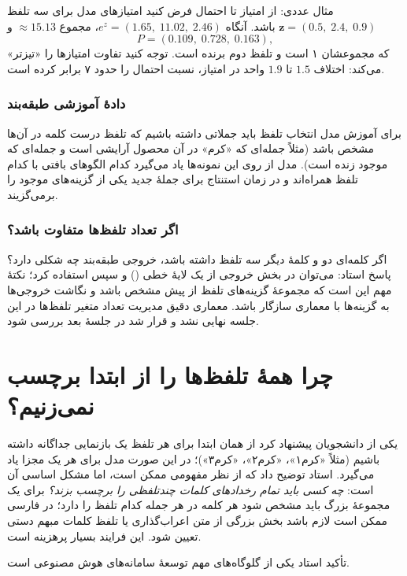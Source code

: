 \begin{addedbox}{مثال عددی: از امتیاز تا احتمال}
فرض کنید امتیازهای مدل برای سه تلفظ $\mathbf{z}=(0.5,\;2.4,\;0.9)$ باشد. آنگاه $e^{z}=(1.65,\;11.02,\;2.46)$، مجموع $\approx15.13$ و
\[
P=(0.109,\;0.728,\;0.163),
\]
که مجموعشان ۱ است و تلفظ دوم برنده است. توجه کنید  تفاوت امتیازها را «تیزتر» می‌کند: اختلاف $1.5$ تا $1.9$ واحد در امتیاز، نسبت احتمال را حدود ۷ برابر کرده است.
\end{addedbox}

\subsubsection{داده‌ٔ آموزشی طبقه‌بند}
برای آموزش مدل انتخاب تلفظ باید جملاتی داشته باشیم که تلفظ درست کلمه در آن‌ها مشخص باشد (مثلاً جمله‌ای که «کرم» در آن محصول آرایشی است و جمله‌ای که موجود زنده است). مدل از روی این نمونه‌ها یاد می‌گیرد کدام الگوهای بافتی با کدام تلفظ همراه‌اند و در زمان استنتاج برای جملهٔ جدید یکی از گزینه‌های موجود را برمی‌گزیند.

\subsubsection{اگر تعداد تلفظ‌ها متفاوت باشد؟}
اگر کلمه‌ای دو و کلمهٔ دیگر سه تلفظ داشته باشد، خروجی طبقه‌بند چه شکلی دارد؟ پاسخ استاد: می‌توان در بخش خروجی از یک لایهٔ خطی () و سپس  استفاده کرد؛ نکتهٔ مهم این است که مجموعهٔ گزینه‌های تلفظ از پیش مشخص باشد و نگاشت خروجی‌ها به گزینه‌ها با معماری سازگار باشد. معماری دقیق مدیریت تعداد متغیر تلفظ‌ها در این جلسه نهایی نشد و قرار شد در جلسهٔ بعد بررسی شود.

\section{چرا همهٔ تلفظ‌ها را از ابتدا برچسب نمی‌زنیم؟}
\label{sec:selfsup}

یکی از دانشجویان پیشنهاد کرد از همان ابتدا برای هر تلفظ یک بازنمایی جداگانه داشته باشیم (مثلاً «کرم۱»، «کرم۲»، «کرم۳»)؛ در این صورت مدل برای هر یک  مجزا یاد می‌گیرد. استاد توضیح داد که از نظر مفهومی ممکن است، اما مشکل اساسی آن است: \emph{چه کسی باید تمام رخدادهای کلمات چندتلفظی را برچسب بزند؟} برای یک مجموعهٔ بزرگ باید مشخص شود هر کلمه در هر جمله کدام تلفظ را دارد؛ در فارسی ممکن است لازم باشد بخش بزرگی از متن اعراب‌گذاری یا تلفظ کلمات مبهم دستی تعیین شود. این فرایند بسیار پرهزینه است.

\begin{exambox}{تأکید استاد}
 یکی از گلوگاه‌های مهم توسعهٔ سامانه‌های هوش مصنوعی است.
\end{exambox}

